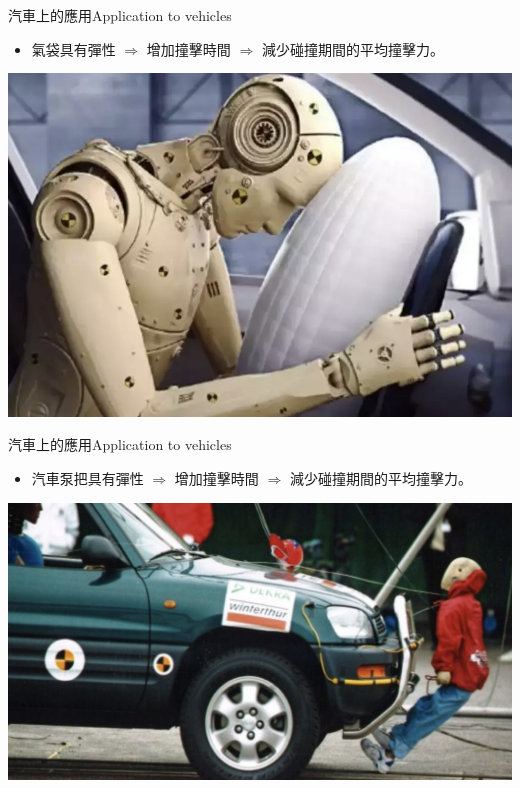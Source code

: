 \documentclass[beamer=true]{standalone}
\begin{document}

\begin{frame}{汽車上的應用Application to vehicles}
    \begin{itemize}
        \item 氣袋具有彈性 $\Rightarrow$ 增加撞擊時間 $\Rightarrow$ 減少碰撞期間的平均撞擊力。
    \end{itemize}
    \bigskip
    {\par\centering
        \includegraphics[width=.5\textwidth]{assets/5a24494a.png}
        \par}
\end{frame}

\begin{frame}{汽車上的應用Application to vehicles}
    \begin{itemize}
        \item 汽車泵把具有彈性 $\Rightarrow$ 增加撞擊時間 $\Rightarrow$ 減少碰撞期間的平均撞擊力。
    \end{itemize}\bigskip
    {\par\centering
        \includegraphics[width=.6\textwidth]{assets/b4012cdb.png}
        \par}
\end{frame}
\end{document}
